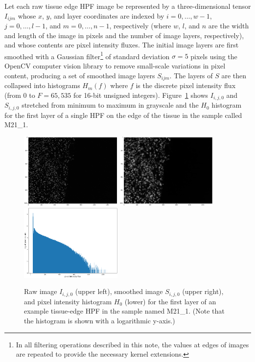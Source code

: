 \documentclass[letterpaper,11pt]{article}
\newcommand{\reffig}[1]{Figure~\ref{#1}}
\begin{document}
Let each raw tissue edge HPF image be represented by a three-dimensional tensor $I_{ijm}$ whose $x$, $y$, and layer coordinates are indexed by $i=0,\ldots,w-1$, $j=0,\ldots,l-1$, and $m=0,\ldots,n-1$, respectively (where $w$, $l$, and $n$ are the width and length of the image in pixels and the number of image layers, respectively), and whose contents are pixel intensity fluxes. The initial image layers are first smoothed with a Gaussian filter\footnote{In all filtering operations described in this note, the values at edges of images are repeated to provide the necessary kernel extensions.} of standard deviation $\sigma=5$ pixels using the OpenCV computer vision library \cite{opencv_library} to remove small-scale variations in pixel content, producing a set of smoothed image layers $S_{ijm}$. The layers of $S$ are then collapsed into histograms $H_{m}(f)$ where $f$ is the discrete pixel intensity flux (from 0 to $F=65,535$ for 16-bit unsigned integers). \reffig{fig:raw_to_smoothed_to_histogram} shows $I_{i,j,0}$ and $S_{i,j,0}$ stretched from minimum to maximum in grayscale and the $H_{0}$ histogram for the first layer of a single HPF on the edge of the tissue in the sample called M21\_1. 

\begin{figure}[!ht]
\centering
\includegraphics[width=0.45\textwidth]{images/masking/example_raw_image}
\includegraphics[width=0.45\textwidth]{images/masking/example_smoothed_image}
\includegraphics[width=0.45\textwidth]{images/masking/example_histogram}
\caption{\footnotesize Raw image $I_{i,j,0}$ (upper left), smoothed image $S_{i,j,0}$ (upper right), and pixel intensity histogram $H_{0}$ (lower) for the first layer of an example tissue-edge HPF in the sample named M21\_1. (Note that the histogram is shown with a logarithmic y-axis.)}
\label{fig:raw_to_smoothed_to_histogram}
\end{figure}
\end{document}
